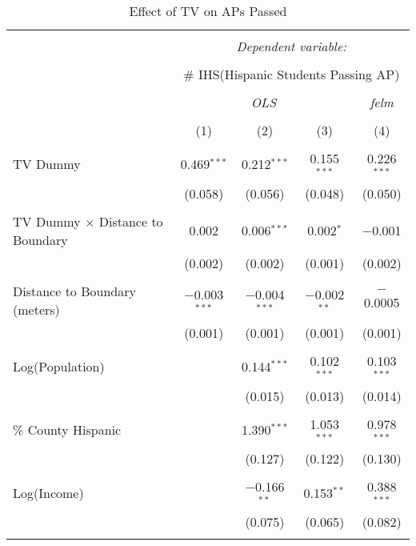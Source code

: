 
\begin{table}[!htbp] \centering 
  \caption{Effect of TV on APs Passed} 
  \label{} 
\begin{tabular}{@{\extracolsep{-2pt}}lcccc} 
\\[-1.8ex]\hline 
\hline \\[-1.8ex] 
 & \multicolumn{4}{c}{\textit{Dependent variable:}} \\ 
\cline{2-5} 
\\[-1.8ex] & \multicolumn{4}{c}{\# IHS(Hispanic Students Passing AP)} \\ 
\\[-1.8ex] & \multicolumn{3}{c}{\textit{OLS}} & \textit{felm} \\ 
\\[-1.8ex] & (1) & (2) & (3) & (4)\\ 
\hline \\[-1.8ex] 
 TV Dummy & 0.469$^{***}$ & 0.212$^{***}$ & 0.155$^{***}$ & 0.226$^{***}$ \\ 
  & (0.058) & (0.056) & (0.048) & (0.050) \\ 
  & & & & \\ 
 TV Dummy $\times$ Distance to Boundary & 0.002 & 0.006$^{***}$ & 0.002$^{*}$ & $-$0.001 \\ 
  & (0.002) & (0.002) & (0.001) & (0.002) \\ 
  & & & & \\ 
 Distance to Boundary (meters) & $-$0.003$^{***}$ & $-$0.004$^{***}$ & $-$0.002$^{**}$ & $-$0.0005 \\ 
  & (0.001) & (0.001) & (0.001) & (0.001) \\ 
  & & & & \\ 
 Log(Population) &  & 0.144$^{***}$ & 0.102$^{***}$ & 0.103$^{***}$ \\ 
  &  & (0.015) & (0.013) & (0.014) \\ 
  & & & & \\ 
 \% County Hispanic &  & 1.390$^{***}$ & 1.053$^{***}$ & 0.978$^{***}$ \\ 
  &  & (0.127) & (0.122) & (0.130) \\ 
  & & & & \\ 
 Log(Income) &  & $-$0.166$^{**}$ & 0.153$^{**}$ & 0.388$^{***}$ \\ 
  &  & (0.075) & (0.065) & (0.082) \\ 
  & & & & \\ 

\end{tabular}
\end{table}
